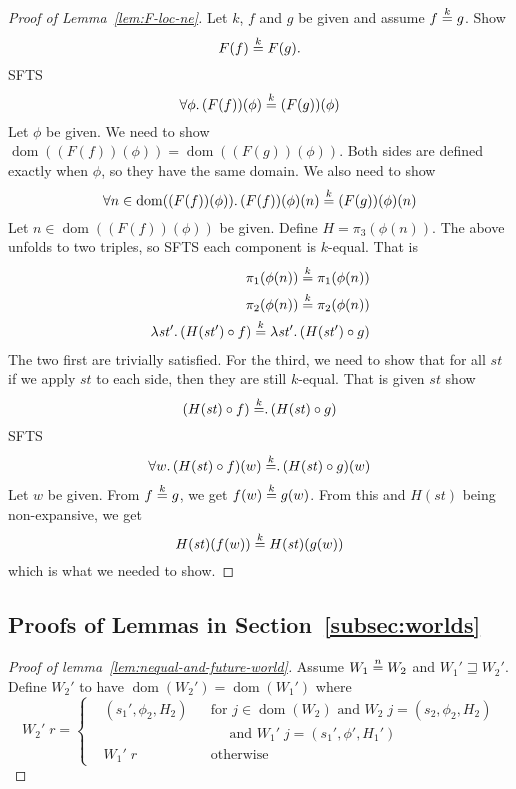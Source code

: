 \documentclass{article}
\newcommand{\nequal}[1][n]{\stackrel{\tiny{#1}}{=}}
\DeclareMathOperator{\dom}{dom}
\newcommand{\var}[1]{\mathit{#1}}
\newcommand{\future}{\mathbin{\sqsupseteq}}
\begin{document}
\begin{appendices}
\begin{proof}[Proof of Lemma~\ref{lem:F-loc-ne}]
Let $k$, $f$ and $g$ be given and assume $f \nequal[k] g$. Show
\[
F(f) \nequal[k] F(g).
\]
SFTS
\[
\forall \phi \ldotp (F(f))(\phi) \nequal[k] (F(g))(\phi)
\]
Let $\phi$ be given. We need to show $\dom((F(f))(\phi)) = \dom((F(g))(\phi))$. Both sides are defined exactly when $\phi$, so they have the same domain. We also need to show
\[
\forall n \in \dom((F(f))(\phi))\ldotp (F(f))(\phi)(n) \nequal[k] (F(g))(\phi)(n)
\]
Let $n \in  \dom((F(f))(\phi))$ be given. Define $H = \pi_3 (\phi(n))$. The above unfolds to two triples, so SFTS each component is $k$-equal. That is
\begin{align*}
  \pi_1(\phi(n)) \nequal[k] \pi_1(\phi(n))\\
  \pi_2(\phi(n)) \nequal[k] \pi_2(\phi(n))\\
  \lambda \var{st}'\ldotp (H(\var{st}') \circ f) \nequal[k]   \lambda \var{st}'\ldotp (H(\var{st}') \circ g)
\end{align*}
The two first are trivially satisfied. For the third, we need to show that for all $\var{st}$ if we apply $\var{st}$ to each side, then they are still $k$-equal. That is given $\var{st}$ show
\[
  (H(\var{st}) \circ f) \nequal[k]   \ldotp (H(\var{st}) \circ g)
\]
SFTS
\[
\forall w \ldotp (H(\var{st}) \circ f)(w) \nequal[k]   \ldotp (H(\var{st}) \circ g)(w)
\]
Let $w$ be given. From $f \nequal[k] g$, we get $f(w) \nequal[k] g(w)$. From this and $H(st)$ being non-expansive, we get
\[
  H(\var{st})(f(w)) \nequal[k]   H(\var{st})(g(w))
\]
which is what we needed to show.

\end{proof}
\subsection{Proofs of Lemmas in Section~\ref{subsec:worlds}}
\begin{proof}[Proof of lemma~\ref{lem:nequal-and-future-world}]
  Assume $W_1 \nequal W_2$ and $W_1' \future W_2'$. Define $W_2'$ to have $\dom(W_2')=\dom(W_1')$ where
\[
  W_2' \; r = \left\{
  \begin{aligned}
    & (s_1',\phi_2,H_2) & &\text{for } j \in \dom(W_2) \text{ and } W_2 \; j = (s_2,\phi_2,H_2) \\
    &                  & &\quad \text{ and } W_1' \; j = (s_1',\phi',H_1') \\
    & W_1' \; r        & &\text{otherwise}
  \end{aligned} 
  \right.
\]


\end{proof}
\end{appendices}
\end{document}
